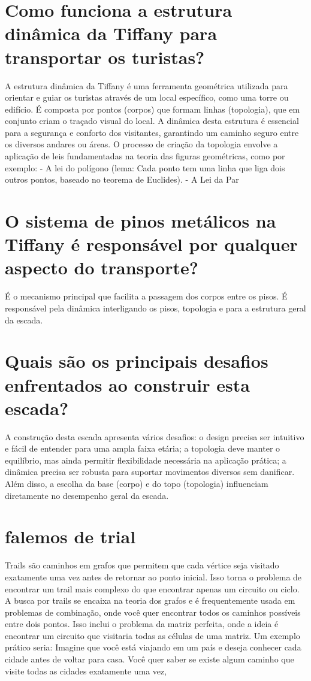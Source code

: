 \documentclass[11pt,a4paper]{article}
\begin{document}
\section{Como funciona a estrutura dinâmica da Tiffany para transportar os turistas?}
A estrutura dinâmica da Tiffany é uma ferramenta geométrica utilizada para orientar e guiar os turistas através de um local específico, como uma torre ou edifício. É composta por pontos (corpos) que formam linhas (topologia), que em conjunto criam o traçado visual do local. A dinâmica desta estrutura é essencial para a segurança e conforto dos visitantes, garantindo um caminho seguro entre os diversos andares ou áreas. O processo de criação da topologia envolve a aplicação de leis fundamentadas na teoria das figuras geométricas, como por exemplo: - A lei do polígono (lema: Cada ponto tem uma linha que liga dois outros pontos, baseado no teorema de Euclides). - A Lei da Par

\section{O sistema de pinos metálicos na Tiffany é responsável por qualquer aspecto do transporte?}
É o mecanismo principal que facilita a passagem dos corpos entre os pisos. É responsável pela dinâmica interligando os pisos, topologia e para a estrutura geral da escada.

\section{Quais são os principais desafios enfrentados ao construir esta escada?}
A construção desta escada apresenta vários desafios: o design precisa ser intuitivo e fácil de entender para uma ampla faixa etária; a topologia deve manter o equilíbrio, mas ainda permitir flexibilidade necessária na aplicação prática; a dinâmica precisa ser robusta para suportar movimentos diversos sem danificar. Além disso, a escolha da base (corpo) e do topo (topologia) influenciam diretamente no desempenho geral da escada.

\section{falemos de trial}
Trails são caminhos em grafos que permitem que cada vértice seja visitado exatamente uma vez antes de retornar ao ponto inicial. Isso torna o problema de encontrar um trail mais complexo do que encontrar apenas um circuito ou ciclo. A busca por trails se encaixa na teoria dos grafos e é frequentemente usada em problemas de combinação, onde você quer encontrar todos os caminhos possíveis entre dois pontos. Isso inclui o problema da matriz perfeita, onde a ideia é encontrar um circuito que visitaria todas as células de uma matriz. Um exemplo prático seria: Imagine que você está viajando em um país e deseja conhecer cada cidade antes de voltar para casa. Você quer saber se existe algum caminho que visite todas as cidades exatamente uma vez,
\end{document}
